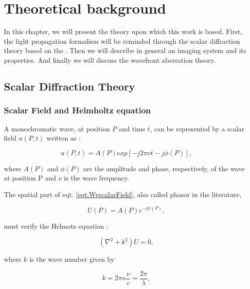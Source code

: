 
\chapter{Theoretical background} 
\label{ch:THback}

In this chapter, we will present the theory upon which this work is based. First, the light propagation formalism will be reminded through the scalar diffraction theory based on the \citet{goodman_1968}. Then we will describe in general an imaging system and its properties. And finally we will discuss the wavefront aberration theory.

\section{Scalar Diffraction Theory}
\label{sec:ScaDifTh}

\subsection{Scalar Field and Helmholtz equation}
\label{subsec:ScalF_HelmEqt}

A monochromatic wave, at position $P$ and time $t$, can be represented by a scalar field $u(P,t)$ written as :

\begin{equation}
u(P,t) =  A(P) exp\left[-j2\pi\nu t - j\phi(P)\right],
\label{eqt:WvscalarField}
\end{equation}

where $A(P)$ and $\phi(P)$ are the amplitude and phase, respectively, of the wave at position P and $\nu$ is the wave frequency.

The spatial part of eqt. \eqref{eqt:WvscalarField}, also called  phasor  in the literature, 

\begin{equation}
U(P) = A(P)e^{-j\phi(P)},
\label{eqt:phasor}
\end{equation}

must verify the Helmotz equation : 

\begin{equation}
(\nabla^2 + k^2)U = 0,
\label{eqt:HelmholtzEqt}
\end{equation}

where $k$ is the wave number given by

\begin{equation}
k = 2\pi n \frac{\nu}{c} = \frac{2\pi}{\lambda},
\label{eqt:wavenumber}
\end{equation}

